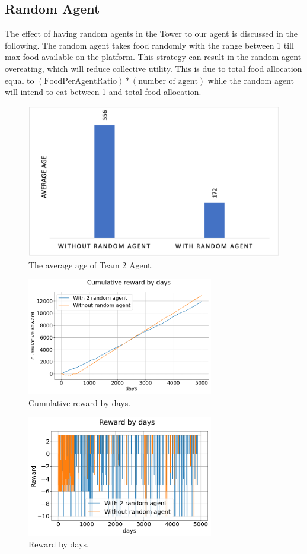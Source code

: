 \subsection{Random Agent}
The effect of having random agents in the Tower to our agent is discussed in the following. The random agent takes food randomly with the range between 1 till max food available on the platform. This strategy can result in the random agent overeating, which will reduce collective utility. This is due to total food allocation equal to $(\textrm{FoodPerAgentRatio}) * (\textrm{number of agent})$ while the random agent will intend to eat between 1 and total food allocation.
\begin{figure}
\centering
\includegraphics{004_team_2_agent_design/team2avage}
\caption{The average age of Team 2 Agent.}
\label{team2av}
\end{figure}
\begin{figure}
\centering
\includegraphics{004_team_2_agent_design/cumrewardbydays}
\caption{Cumulative reward by days.}
\label{cumreward-team2}
\end{figure}
\begin{figure}
\centering
\includegraphics{004_team_2_agent_design/rewardbydays}
\caption{Reward by days.}
\label{dayreward-team2}
\end{figure}
